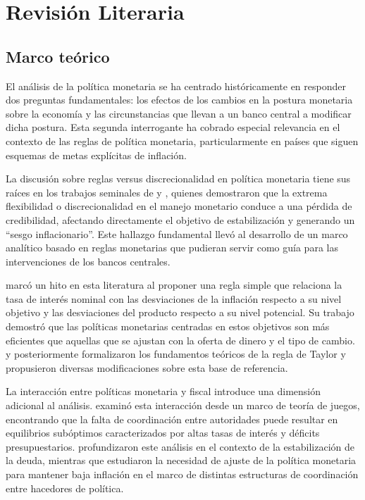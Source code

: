 \documentclass[
  authoryear,
  preprint]{elsarticle}
\begin{document}
\section{Revisión Literaria}\label{revisiuxf3n-literaria}

\subsection{Marco teórico}\label{marco-teuxf3rico}

El análisis de la política monetaria se ha centrado históricamente en
responder dos preguntas fundamentales: los efectos de los cambios en la
postura monetaria sobre la economía y las circunstancias que llevan a un
banco central a modificar dicha postura. Esta segunda interrogante ha
cobrado especial relevancia en el contexto de las reglas de política
monetaria, particularmente en países que siguen esquemas de metas
explícitas de inflación.

La discusión sobre reglas versus discrecionalidad en política monetaria
tiene sus raíces en los trabajos seminales de \citep{kydland_rules_1977}
y \citep{barro_rules_1983}, quienes demostraron que la extrema
flexibilidad o discrecionalidad en el manejo monetario conduce a una
pérdida de credibilidad, afectando directamente el objetivo de
estabilización y generando un ``sesgo inflacionario''. Este hallazgo
fundamental llevó al desarrollo de un marco analítico basado en reglas
monetarias que pudieran servir como guía para las intervenciones de los
bancos centrales.

\citep{taylor_discretion_1993} marcó un hito en esta literatura al
proponer una regla simple que relaciona la tasa de interés nominal con
las desviaciones de la inflación respecto a su nivel objetivo y las
desviaciones del producto respecto a su nivel potencial. Su trabajo
demostró que las políticas monetarias centradas en estos objetivos son
más eficientes que aquellas que se ajustan con la oferta de dinero y el
tipo de cambio. \citep{svensson_inflation_1997}y
\citep{clarida_science_1999} posteriormente formalizaron los fundamentos
teóricos de la regla de Taylor y propusieron diversas modificaciones
sobre esta base de referencia.

La interacción entre políticas monetaria y fiscal introduce una
dimensión adicional al análisis. \citep{nordhaus_policy_1994} examinó
esta interacción desde un marco de teoría de juegos, encontrando que la
falta de coordinación entre autoridades puede resultar en equilibrios
subóptimos caracterizados por altas tasas de interés y déficits
presupuestarios. \citep{van_aarle_monetary_1995} profundizaron este
análisis en el contexto de la estabilización de la deuda, mientras que
estudiaron la necesidad de ajuste de la política monetaria para mantener
baja inflación en el marco de distintas estructuras de coordinación
entre hacedores de política.
\end{document}

